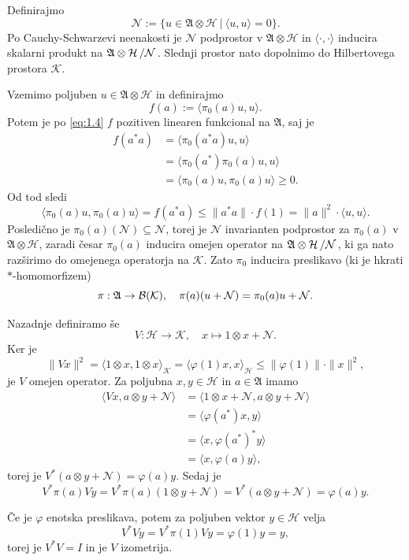 \begin{dokaz}
    Definirajmo $$\mathcal{N} := \{u \in \mathfrak{A} \otimes \mathcal{H}\ |\ \langle u, u \rangle = 0\}.$$
    Po Cauchy-Schwarzevi neenakosti je $\mathcal{N}$ podprostor v $\mathfrak{A} \otimes \mathcal{H}$ in $\langle \cdot, \cdot \rangle$
    inducira skalarni produkt na $\quot{\mathfrak{A} \otimes \mathcal{H}}{\mathcal{N}}$. 
    Slednji prostor nato dopolnimo do Hilbertovega prostora $\mathcal{K}$.

    Vzemimo poljuben $u \in \mathfrak{A} \otimes \mathcal{H}$ in definirajmo $$f(a) := \langle \pi_0 (a) u, u \rangle.$$ 
    Potem je po \eqref{eq:1.4} $f$ pozitiven linearen funkcional na $\mathfrak{A}$, saj je
    \begin{align*}
        f(a^* a) &= \langle \pi_0 (a^* a) u, u \rangle\\
        &= \langle \pi_0 (a^*) \pi_0 (a) u, u\rangle \\
        &= \langle \pi_0 (a) u, \pi_0 (a) u\rangle \geq 0.
    \end{align*}
    Od tod sledi
    $$\langle \pi_0 (a) u, \pi_0 (a) u\rangle = f(a^* a) \leq \| a^* a\| \cdot f(1) = \| a\|^2 \cdot \langle u, u \rangle.$$
    Posledično je $\pi_0 (a) (\mathcal{N}) \subseteq \mathcal{N}$, torej je $\mathcal{N}$ invarianten podprostor za $\pi_0 (a)$ v $\mathfrak{A} \otimes \mathcal{H}$, zaradi česar 
    $\pi_0 (a)$ inducira omejen operator na $\quot{\mathfrak{A} \otimes \mathcal{H}}{\mathcal{N}}$,
    ki ga nato razširimo do omejenega operatorja na $\mathcal{K}$. 
    Zato $\pi_0$ inducira preslikavo (ki je hkrati $*$-homomorfizem) 
    $$\pi:\mathfrak{A} \to \operatorname{\mathcal{B} (\mathcal{K})},\quad \pi (a) (u + \mathcal{N}) = \pi_0 (a)u + \mathcal{N}.$$

    Nazadnje definiramo še $$V: \mathcal{H} \to \mathcal{K},\quad x \mapsto 1 \otimes x + \mathcal{N}.$$
    Ker je $$\| V x \|^2 = \langle 1 \otimes x, 1 \otimes x \rangle_{\mathcal{K}} = \langle \varphi (1) x, x \rangle_{\mathcal{H}} \leq \| \varphi (1)\| \cdot \| x \|^2,$$
    je $V$ omejen operator. Za poljubna $x, y \in \mathcal{H}$ in $a \in \mathfrak{A}$ imamo
    \begin{align*}
        \langle V x, a \otimes y + \mathcal{N} \rangle &= \langle 1 \otimes x + \mathcal{N}, a \otimes y + \mathcal{N}\rangle\\
        &= \langle \varphi (a^*) x, y \rangle\\
        &= \langle x, \varphi (a^*)^* y \rangle\\
        &= \langle x, \varphi(a) y \rangle,
    \end{align*}
    torej je $V^* (a \otimes y + \mathcal{N}) = \varphi(a) y$. Sedaj je
    $$V^* \pi(a) V y = V^* \pi (a) (1 \otimes y + \mathcal{N}) = V^* (a \otimes y + \mathcal{N}) = \varphi(a) y.$$

    Če je $\varphi$ enotska preslikava, potem za poljuben vektor $y \in \mathcal{H}$ velja
    $$V^* V y = V^* \pi(1) V y = \varphi(1) y = y,$$
    torej je $V^* V = I$ in je $V$ izometrija.
\end{dokaz}

